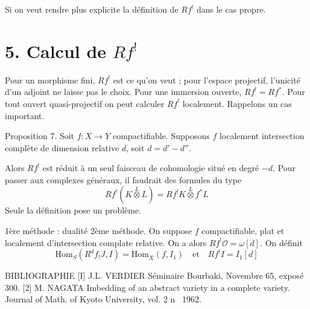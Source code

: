 \documentclass[12pt]{article}
\begin{document}
Si on veut rendre plus explicite la définition de $Rf^{!}$ dans le cas propre.

\section{5. Calcul de $Rf^{!}$}
Pour un morphisme fini, $Rf^{!}$ est ce qu'on veut ; pour l'espace projectif, l'unicité d'un adjoint ne laisse pas le choix.
Pour une immersion ouverte, $R f^{!}=R f^{*}$.
Pour tout ouvert quasi-projectif on peut calculer $Rf^{!}$ localement.
Rappelons un cas important.

Proposition 7. Soit $f: X \to Y$ compactifiable. Supposons $f$ localement intersection complète de dimension relative $d$, soit $d=d'-d''$.

Alors $Rf^{!}$ est réduit à un seul faisceau de cohomologie situé en degré $-d$.
Pour passer aux complexes généraux, il faudrait des formules du type
\[Rf^{!}(K \stackrel{L}{\otimes} L)=Rf^{!}K \stackrel{L}{\otimes} f^{*}L\]
Seule la définition pose un problème.

1ère méthode : dualité
2ème méthode. On suppose $f$ compactifiable, plat et localement d'intersection complate relative. On a alors $Rf^{!}\mathscr{O}=\omega[d]$.
On définit
\[\mathrm{Hom}_{S}\left(R^{d} f_{!} J, I\right)=\mathrm{Hom}_{\overline{X}}\left(f, I_{1}\right) \quad \text{et} \quad R f^{!} I=I_{1}[d]\]

BIBLIOGRAPHIE
[I] J.L. VERDIER Séminaire Bourbaki, Novembre 65, exposé 300.
[2] M. NAGATA Imbedding of an abstract variety in a complete variety. Journal of Math. of Kyoto University, vol. 2 n~ 1962.
\end{document}
